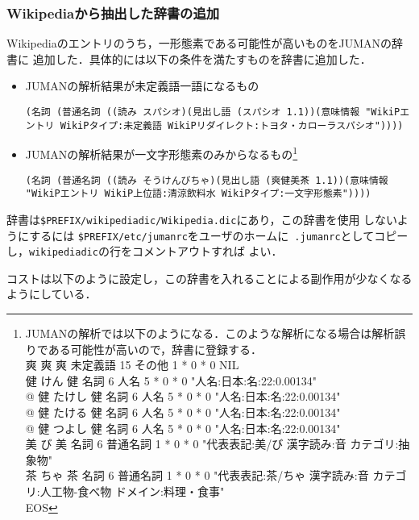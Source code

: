 \documentclass[a4j,titlepage]{jarticle}
\begin{document}
\subsubsection{Wikipediaから抽出した辞書の追加}

Wikipediaのエントリのうち，一形態素である可能性が高いものをJUMANの辞書に
追加した．具体的には以下の条件を満たすものを辞書に追加した．

\begin{itemize}
 \item JUMANの解析結果が未定義語一語になるもの
\begin{verbatim}
(名詞 (普通名詞 ((読み スパシオ)(見出し語 (スパシオ 1.1))(意味情報 "WikiPエントリ WikiPタイプ:未定義語 WikiPリダイレクト:トヨタ・カローラスパシオ"))))
\end{verbatim}
 \item JUMANの解析結果が一文字形態素のみからなるもの\footnote{JUMANの解析では以下のようになる．このような解析になる場合は解析誤りである可能性が高いので，辞書に登録する．\\
爽 爽 爽 未定義語 15 その他 1 * 0 * 0 NIL\\
健 けん 健 名詞 6 人名 5 * 0 * 0 "人名:日本:名:22:0.00134"\\
@ 健 たけし 健 名詞 6 人名 5 * 0 * 0 "人名:日本:名:22:0.00134"\\
@ 健 たける 健 名詞 6 人名 5 * 0 * 0 "人名:日本:名:22:0.00134"\\
@ 健 つよし 健 名詞 6 人名 5 * 0 * 0 "人名:日本:名:22:0.00134"\\
美 び 美 名詞 6 普通名詞 1 * 0 * 0 "代表表記:美/び 漢字読み:音 カテゴリ:抽象物"\\
茶 ちゃ 茶 名詞 6 普通名詞 1 * 0 * 0 "代表表記:茶/ちゃ 漢字読み:音 カテゴリ:人工物-食べ物 ドメイン:料理・食事"\\
EOS
}
\begin{verbatim}
(名詞 (普通名詞 ((読み そうけんびちゃ)(見出し語 (爽健美茶 1.1))(意味情報 "WikiPエントリ WikiP上位語:清涼飲料水 WikiPタイプ:一文字形態素"))))
\end{verbatim}
\end{itemize}

辞書は\texttt{\$PREFIX/wikipediadic/Wikipedia.dic}にあり，この辞書を使用
しないようにするには
\texttt{\$PREFIX/etc/jumanrc}をユーザのホームに{\tt
.jumanrc}としてコピーし，\texttt{wikipediadic}の行をコメントアウトすれば
よい．

コストは以下のように設定し，この辞書を入れることによる副作用が少なくなる
ようにしている．
\end{document}
